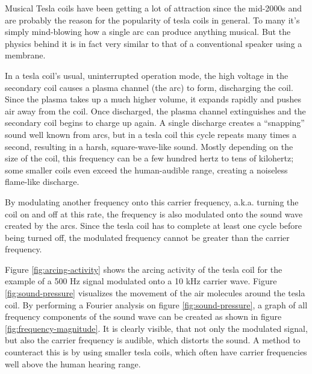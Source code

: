 Musical Tesla coils have been getting a lot of attraction since the mid-2000s and are probably the reason for the popularity of tesla coils in general. To many it's simply mind-blowing how a single arc can produce anything musical. But the physics behind it is in fact very similar to that of a conventional speaker using a membrane.

In a tesla coil's usual, uninterrupted operation mode, the high voltage in the secondary coil causes a plasma channel (the arc) to form, discharging the coil. Since the plasma takes up a much higher volume, it expands rapidly and pushes air away from the coil. Once discharged, the plasma channel extinguishes and the secondary coil begins to charge up again. A single discharge creates a \enquote{snapping} sound well known from arcs, but in a tesla coil this cycle repeats many times a second, resulting in a harsh, square-wave-like sound. Mostly depending on the size of the coil, this frequency can be a few hundred hertz to tens of kilohertz; some smaller coils even exceed the human-audible range, creating a noiseless flame-like discharge.

By modulating another frequency onto this carrier frequency, a.k.a. turning the coil on and off at this rate, the frequency is also modulated onto the sound wave created by the arcs. Since the tesla coil has to complete at least one cycle before being turned off, the modulated frequency cannot be greater than the carrier frequency. 

Figure \ref{fig:arcing-activity} shows the arcing activity of the tesla coil for the example of a 500 Hz signal modulated onto a 10 kHz carrier wave. Figure \ref{fig:sound-pressure} visualizes the movement of the air molecules around the tesla coil. By performing a Fourier analysis on figure \ref{fig:sound-pressure}, a graph of all frequency components of the sound wave can be created as shown in figure \ref{fig:frequency-magnitude}. It is clearly visible, that not only the modulated signal, but also the carrier frequency is audible, which distorts the sound. A method to counteract this is by using smaller tesla coils, which often have carrier frequencies well above the human hearing range.

